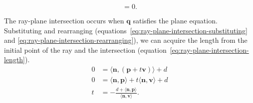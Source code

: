 \begin{frame}
\begin{minipage}[t]{0.45\linewidth}
\begin{equation}
			= 0.
		\end{equation}
		\begin{annotatedEquationEnv}
		\end{annotatedEquationEnv}
	\end{minipage}
	\par\noindent The ray-plane intersection occurs when \(\mathbf{q}\) satisfies the plane equation. Substituting and rearranging (equations~\ref{eq:ray-plane-intersection-substituting} and \ref{eq:ray-plane-intersection-rearranging}), we can acquire the length from the initial point of the ray and the intersection (equation~\ref{eq:ray-plane-intersection-length}).
	\begin{align}
		\label{eq:ray-plane-intersection-substituting}
		0 & = \langle \mathbf{n}, \left( \mathbf{p} + t \mathbf{v} \right) \rangle + d                    \\
		\label{eq:ray-plane-intersection-rearranging}
		0 & = \langle \mathbf{n}, \mathbf{p} \rangle + t \langle \mathbf{n},\mathbf{v} \rangle + d        \\
		\label{eq:ray-plane-intersection-length}
		t & = -\frac{d + \langle \mathbf{n}, \mathbf{p} \rangle}{\langle \mathbf{n}, \mathbf{v} \rangle}.
	\end{align}
\end{frame}

